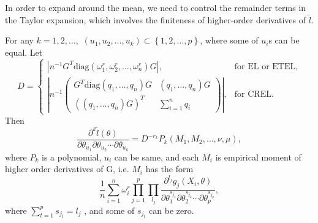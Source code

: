 In order to expand around the mean, we need to control the
remainder terms in the Taylor expansion, which involves the finiteness of higher-order
derivatives of $\tilde{l}$. 
\begin{lemma}
\label{lem:control-higher-order-derivative-2}
For any $k=1,2,\ldots,$ $\left(u_{1},u_{2},\ldots,u_{k}\right)\subset\left\{ 1,2,\ldots,p\right\} $,
where some of $u_{i}$s can be equal. Let 
\[
D=\begin{cases}
\left|n^{-1}G^{T}\mathrm{diag}\left(\omega_{1}^{r},\omega_{2}^{r},\ldots,\omega_{n}^{r}\right)G\right|, & \text{for EL or ETEL,}\\
\left|n^{-1}\left(\begin{array}{cc}
G^{T}\mathrm{diag}\left(q_{1},\ldots,q_{n}\right)G & \left(q_{1},\ldots,q_{n}\right)G\\
\left(\left(q_{1},\ldots,q_{n}\right)G\right)^{T} & \sum_{i=1}^{n}q_{i}
\end{array}\right)\right|, & \text{for CREL.}
\end{cases}
\]
Then 
\[
\frac{\partial^{k}\tilde{l}\left(\theta\right)}{\partial\theta_{u_{1}}\partial\theta_{u_{2}}\cdots\partial\theta_{u_{k}}}=D^{-r_{k}}P_{k}\left(M_{1},M_{2},\ldots,\nu,\mu\right),
\]
where $P_{k}$ is a polynomial, $u_{i}$ can be same, and each $M_{i}$
is empirical moment of higher order derivatives of G, i.e. $M_{i}$
has the form 
\[
\frac{1}{n}\sum_{i=1}^{n}\omega_{i}^{r}\prod_{j=1}^{p}\prod_{l_{j}}\frac{\partial^{l_{j}}g_{j}\left(X_{i},\theta\right)}{\partial\theta_{1}^{s_{j_{1}}}\partial\theta_{2}^{s_{j_{2}}}\cdots\partial\theta_{p}^{s_{j_{p}}}},
\]
where $\sum_{t=1}^{p}s_{j_{t}}=l_{j}$ , and some of $s_{j_{t}}$
can be zero. \end{lemma}
